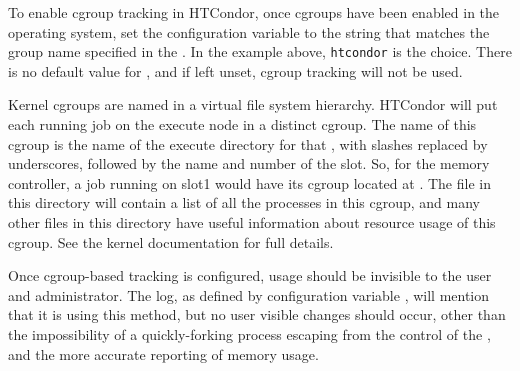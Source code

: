 To enable cgroup tracking in HTCondor, once cgroups have been enabled
in the operating system, set the  configuration
variable to the string that matches the group name specified in 
the .
In the example above, \texttt{htcondor} is the choice.  
There is no default value for , 
and if left unset, cgroup tracking will not be used.

Kernel cgroups are named in a virtual file system hierarchy. 
HTCondor will put each running job on the execute node in a distinct cgroup.
The name of this cgroup is the name of the execute directory for 
that , with slashes replaced by underscores, 
followed by the name and number of the slot.  
So, for the memory controller, 
a job running on slot1 would have its cgroup located at
.  
The  file in this directory will contain a list 
of all the processes in this cgroup, and
many other files in this directory have useful information about resource usage
of this cgroup.  See the kernel documentation for full details.

Once cgroup-based tracking is configured, 
usage should be invisible to the user and administrator.  
The  log, as defined by configuration variable
, 
will mention that it is using this method, 
but no user visible changes should occur,
other than the impossibility of a quickly-forking process escaping from the
control of the ,
and the more accurate reporting of memory usage.
